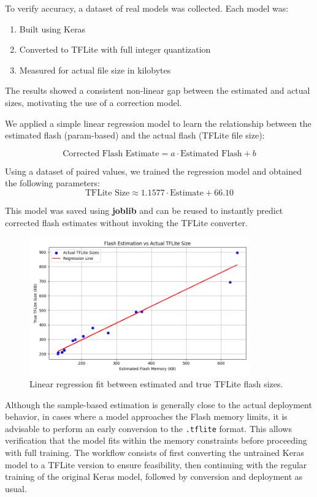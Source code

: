 To verify accuracy, a dataset of real models was collected. Each model was:
\begin{enumerate}
    \item Built using Keras
    \item Converted to TFLite with full integer quantization
    \item Measured for actual file size in kilobytes
\end{enumerate}

The results showed a consistent non-linear gap between the estimated and actual sizes, motivating the use of a correction model.

We applied a simple linear regression model to learn the relationship between the estimated flash (param-based) and the actual flash (TFLite file size):

\[
\text{Corrected Flash Estimate} = a \cdot \text{Estimated Flash} + b
\]

Using a dataset of paired values, we trained the regression model and obtained the following parameters:
\[
\text{TFLite Size} \approx 1.1577 \cdot \text{Estimate} + 66.10
\]

 This model was saved using \textbf{joblib} and can be reused to instantly predict corrected flash estimates without invoking the TFLite converter.

 \begin{figure}[ht]
  \centering
  \includegraphics[width=0.85\textwidth]{Pictures/flash_regression_plot.png}
  \caption{Linear regression fit between estimated and true TFLite flash sizes.}
  \label{fig:flash-regression}
\end{figure}


Although the sample-based estimation is generally close to the actual deployment behavior, in cases where a model approaches the Flash memory limits, it is advisable to perform an early conversion to the \texttt{.tflite} format. This allows verification that the model fits within the memory constraints before proceeding with full training. The workflow consists of first converting the untrained Keras model to a TFLite version to ensure feasibility, then continuing with the regular training of the original Keras model, followed by conversion and deployment as usual.

